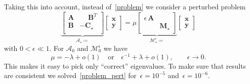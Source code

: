 \documentclass[12pt]{article}
\newcommand{\vect}[1]{\boldsymbol{\mathbf{#1}}}
\begin{document}
Taking this into account, instead of~\eqref{problem} we consider a perturbed\footnotemark{} problem
\begin{equation}\label{problem_pert}
	\underbrace{\begin{bmatrix}
		\vect A & \phantom{-}\vect B^T \\
		\vect B & -\vect C_\star \\
	\end{bmatrix}}_{\mathcal A_\star \coloneqq}
	\begin{bmatrix}
		\vect x \\
		\vect y
	\end{bmatrix}
	=
	\mu
	\underbrace{\begin{bmatrix}
		\epsilon\,\vect A & \\
		& \vect M_\star
	\end{bmatrix}}_{\mathcal M^\epsilon_\star \coloneqq}
	\begin{bmatrix}
		\vect x \\
		\vect y
	\end{bmatrix}
\end{equation}
with $0 < \epsilon \ll 1$. For $\mathcal A_0$ and $\mathcal M^\epsilon_0$ we have
\begin{equation}
	\mu = -\lambda + o(1)\quad\text{or}\quad\epsilon^{-1} + \lambda + o(1),\qquad\epsilon \rightarrow 0.
\end{equation}
This makes it easy to pick only ``correct'' eigenvalues. To make sure that results are consistent we solved~\eqref{problem_pert} for~$\epsilon = 10^{-5}$ and~$\epsilon = 10^{-6}$.

	
\end{document}
